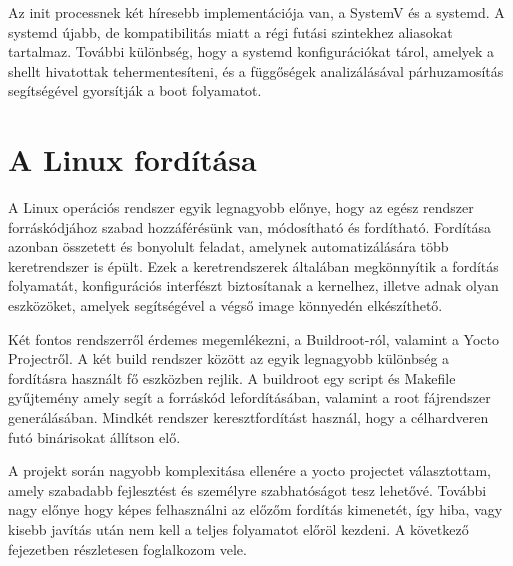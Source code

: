 Az init processnek két híresebb implementációja van, a SystemV és a systemd. A
systemd újabb, de kompatibilitás miatt a régi futási szintekhez aliasokat
tartalmaz. További különbség, hogy a systemd konfigurációkat tárol, amelyek a
shellt hivatottak tehermentesíteni, és a függőségek analizálásával párhuzamosítás
segítségével gyorsítják a boot folyamatot.

\section{A Linux fordítása}

A Linux operációs rendszer egyik legnagyobb előnye, hogy az egész rendszer
forráskódjához szabad hozzáférésünk van, módosítható és fordítható. Fordítása
azonban összetett és bonyolult feladat, amelynek automatizálására több
keretrendszer is épült. Ezek a keretrendszerek általában megkönnyítik a fordítás
folyamatát, konfigurációs interfészt biztosítanak a kernelhez, illetve adnak
olyan eszközöket, amelyek segítségével a végső image könnyedén elkészíthető.

Két fontos rendszerről érdemes megemlékezni, a Buildroot-ról, valamint a Yocto
Projectről. A két build rendszer között az egyik legnagyobb különbség a
fordításra használt fő eszközben rejlik. A buildroot egy script és Makefile
gyűjtemény amely segít a forráskód lefordításában, valamint a root fájrendszer
generálásában. Mindkét rendszer keresztfordítást használ, hogy a célhardveren
futó binárisokat állítson elő.

A projekt során nagyobb komplexitása ellenére a yocto projectet választottam,
amely szabadabb fejlesztést és személyre szabhatóságot tesz lehetővé. További
nagy előnye hogy képes felhasználni az előzőm fordítás kimenetét, így hiba, vagy
kisebb javítás után nem kell a teljes folyamatot előröl kezdeni. A következő
fejezetben részletesen foglalkozom vele.



